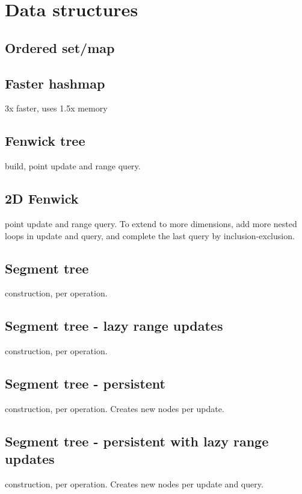 \section{Data structures}

\subsection{Ordered set/map}

\subsection{Faster hashmap}
3x faster, uses 1.5x memory

\subsection{Fenwick tree}
 build,  point update and range query.

\subsection{2D Fenwick}
 point update and range query.
To extend to more dimensions, add more nested loops in update
and query, and complete the last query by inclusion-exclusion.

\subsection{Segment tree}
 construction,  per operation.

\subsection{Segment tree - lazy range updates}
 construction,  per operation.

\subsection{Segment tree - persistent}
 construction,  per operation.
Creates  new nodes per update.

\subsection{Segment tree - persistent with lazy range updates}
 construction,  per operation.
Creates  new nodes per update and query.

